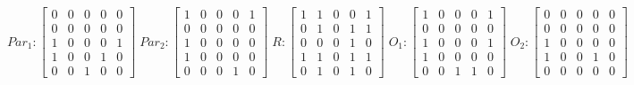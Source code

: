      $$
        Par_{1} : \begin{bmatrix}
            0 & 0 & 0 & 0 & 0 \\
            0 & 0 & 0 & 0 & 0 \\
            1 & 0 & 0 & 0 & 1 \\
			1 & 0 & 0 & 1 & 0 \\
            0 & 0 & 1 & 0 & 0 
        \end{bmatrix}
        \;
        Par_{2} : \begin{bmatrix}
            1 & 0 & 0 & 0 & 1 \\
            0 & 0 & 0 & 0 & 0 \\
            1 & 0 & 0 & 0 & 0 \\
            1 & 0 & 0 & 0 & 0 \\
            0 & 0 & 0 & 1 & 0
        \end{bmatrix}
        \;
        R : \begin{bmatrix}
            1 & 1 & 0 & 0 & 1 \\
            0 & 1 & 0 & 1 & 1 \\
            0 & 0 & 0 & 1 & 0 \\
            1 & 1 & 0 & 1 & 1 \\
            0 & 1 & 0 & 1 & 0
        \end{bmatrix}
        \;
        O_{1} : \begin{bmatrix}
            1 & 0 & 0 & 0 & 1 \\
            0 & 0 & 0 & 0 & 0 \\
            1 & 0 & 0 & 0 & 1 \\
            1 & 0 & 0 & 0 & 0 \\
            0 & 0 & 1 & 1 & 0
        \end{bmatrix}
        \;
        O_{2} : \begin{bmatrix}
            0 & 0 & 0 & 0 & 0 \\
            0 & 0 & 0 & 0 & 0 \\
            1 & 0 & 0 & 0 & 0 \\
            1 & 0 & 0 & 1 & 0 \\
            0 & 0 & 0 & 0 & 0
        \end{bmatrix}
    $$
